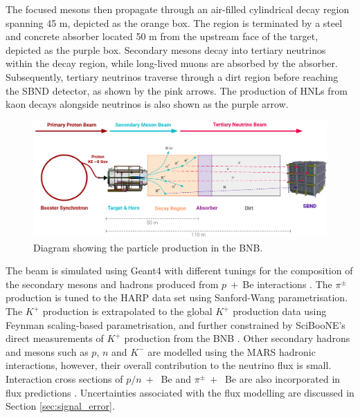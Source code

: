 The focused mesons then propagate through an air-filled cylindrical decay region spanning 45 m, depicted as the orange box.
The region is terminated by a steel and concrete absorber located 50 m from the upstream face of the target, depicted as the purple box.
Secondary mesons decay into tertiary neutrinos within the decay region, while long-lived muons are absorbed by the absorber. 
Subsequently, tertiary neutrinos traverse through a dirt region before reaching the SBND detector, as shown by the pink arrows.
The production of HNLs from kaon decays alongside neutrinos is also shown as the purple arrow.

\begin{figure}[hb!] 
\centering    
\includegraphics[width=1.0\textwidth]{BNBDiagram}
\caption[Particle Production in the Booster Neutrino Beam]{
Diagram showing the particle production in the BNB.
}
\label{fig:BNBDiagram}
\end{figure}

The beam is simulated using Geant4 \cite{geant4} with different tunings for the composition of the secondary mesons and hadrons produced from $p\ +\ $Be interactions \cite{BNBMiniBooNE}.
The $\pi^{\pm}$ production is tuned to the HARP data set using Sanford-Wang parametrisation.
The $K^{+}$ production is extrapolated to the global $K^{+}$ production data using Feynman scaling-based parametrisation, and further constrained by SciBooNE's direct measurements of $K^{+}$ production from the BNB \cite{SciBooNE}. 
Other secondary hadrons and mesons such as $p$, $n$ and $K^{-}$ are modelled using the MARS hadronic interactions, however, their overall contribution to the neutrino flux is small. 
Interaction cross sections of $p/n\ +\ $ Be and $\pi^{\pm}\ +\ $ Be are also incorporated in flux predictions \cite{DavePhd}.
Uncertainties associated with the flux modelling are discussed in Section \ref{sec:signal_error}.

